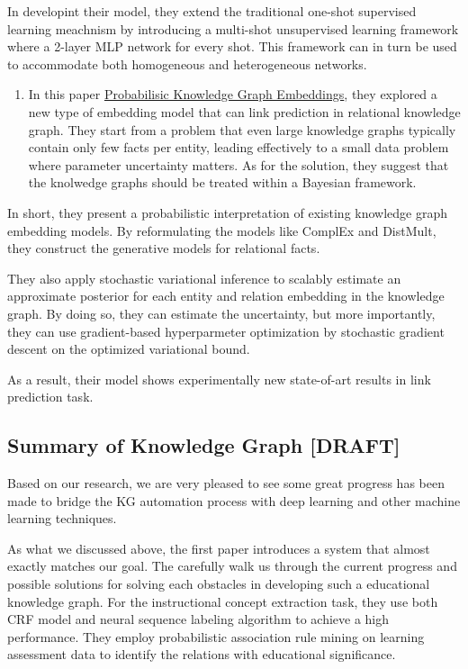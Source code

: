 \documentclass[]{book}
\providecommand{\tightlist}{%
  \setlength{\itemsep}{0pt}\setlength{\parskip}{0pt}}
\theoremstyle{definition}
\theoremstyle{definition}
\theoremstyle{definition}
\theoremstyle{remark}
\begin{document}
In developint their model, they extend the traditional one-shot
supervised learning meachnism by introducing a multi-shot unsupervised
learning framework where a 2-layer MLP network for every shot. This
framework can in turn be used to accommodate both homogeneous and
heterogeneous networks.

\begin{enumerate}
\def\labelenumi{\arabic{enumi}.}
\setcounter{enumi}{2}
\tightlist
\item
  In this paper
  \href{https://openreview.net/pdf?id=rJ4qXnCqFX}{Probabilisic Knowledge
  Graph Embeddings}, they explored a new type of embedding model that
  can link prediction in relational knowledge graph. They start from a
  problem that even large knowledge graphs typically contain only few
  facts per entity, leading effectively to a small data problem where
  parameter uncertainty matters. As for the solution, they suggest that
  the knolwedge graphs should be treated within a Bayesian framework.
\end{enumerate}

In short, they present a probabilistic interpretation of existing
knowledge graph embedding models. By reformulating the models like
ComplEx and DistMult, they construct the generative models for
relational facts.

They also apply stochastic variational inference to scalably estimate an
approximate posterior for each entity and relation embedding in the
knowledge graph. By doing so, they can estimate the uncertainty, but
more importantly, they can use gradient-based hyperparmeter optimization
by stochastic gradient descent on the optimized variational bound.

As a result, their model shows experimentally new state-of-art results
in link prediction task.

\subsection{Summary of Knowledge Graph
{[}DRAFT{]}}\label{summary-of-knowledge-graph-draft}

Based on our research, we are very pleased to see some great progress
has been made to bridge the KG automation process with deep learning and
other machine learning techniques.

As what we discussed above, the first paper introduces a system that
almost exactly matches our goal. The carefully walk us through the
current progress and possible solutions for solving each obstacles in
developing such a educational knowledge graph. For the instructional
concept extraction task, they use both CRF model and neural sequence
labeling algorithm to achieve a high performance. They employ
probabilistic association rule mining on learning assessment data to
identify the relations with educational significance.
\end{document}
